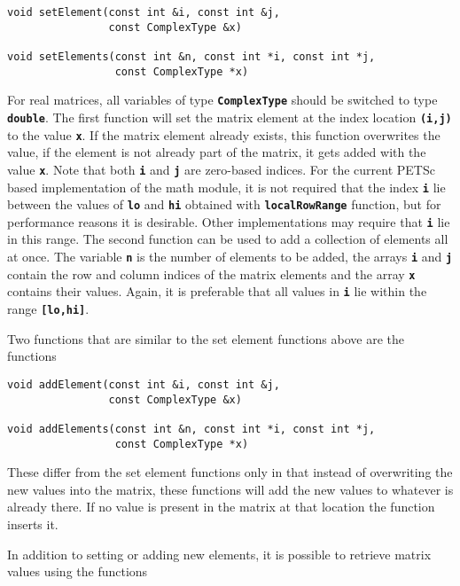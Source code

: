 {
\color{red}
\begin{Verbatim}[fontseries=b]
void setElement(const int &i, const int &j,
                const ComplexType &x)

void setElements(const int &n, const int *i, const int *j,
                 const ComplexType *x)
\end{Verbatim}
}

For real matrices, all variables of type \texttt{\textbf{ComplexType}} should be switched to type \texttt{\textbf{double}}. The first function will set the matrix element at the index location \texttt{\textbf{(i,j)}} to the value \texttt{\textbf{x}}. If the matrix element already exists, this function overwrites the value, if the element is not already part of the matrix, it gets added with the value \texttt{\textbf{x}}. Note that both \texttt{\textbf{i}} and \texttt{\textbf{j}} are zero-based indices. For the current PETSc based implementation of the math module, it is not required that the index \texttt{\textbf{i}} lie between the values of \texttt{\textbf{lo}} and \texttt{\textbf{hi}} obtained with \texttt{\textbf{localRowRange}} function, but for performance reasons it is desirable. Other implementations may require that \texttt{\textbf{i}} lie in this range. The second function can be used to add a collection of elements all at once. The variable \texttt{\textbf{n}} is the number of elements to be added, the arrays \texttt{\textbf{i}} and \texttt{\textbf{j}} contain the row and column indices of the matrix elements and the array \texttt{\textbf{x}} contains their values. Again, it is preferable that all values in \texttt{\textbf{i}} lie within the range \texttt{\textbf{[lo,hi]}}.

Two functions that are similar to the set element functions above are the functions

{
\color{red}
\begin{Verbatim}[fontseries=b]
void addElement(const int &i, const int &j,
                const ComplexType &x)

void addElements(const int &n, const int *i, const int *j,
                 const ComplexType *x)
\end{Verbatim}
}

These differ from the set element functions only in that instead of overwriting the new values into the matrix, these functions will add the new values to whatever is already there. If no value is present in the matrix at that location the function inserts it.

In addition to setting or adding new elements, it is possible to retrieve matrix values using the functions

